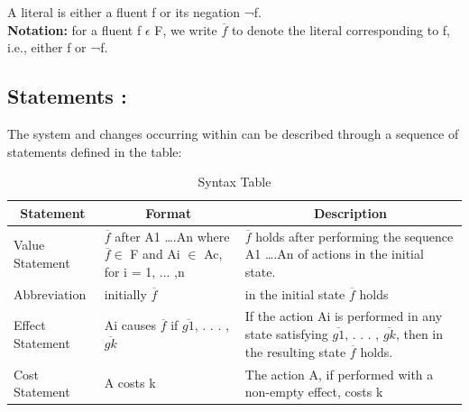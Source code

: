 \documentclass[11pt]{article}
\begin{document}
A literal is either a fluent f or its negation ¬f.\\
\textbf{Notation:} for a fluent f $\epsilon$ F, we write $\overline{f}$ to denote the literal corresponding to f, i.e., either f or ¬f.
\subsection{Statements :}\label{sec:Statements} 
	The system and changes occurring within can be described through a sequence of statements defined in the table:
	\begin{table}[H]
  \centering
    \begin{tabular}{|p{2cm}|p{4cm}|p{9cm}|}
    \hline
    \multicolumn{1}{|c|}{\textbf{Statement}} & \multicolumn{1}{c|}{\textbf{Format}} & \multicolumn{1}{c|}{\textbf{Description}} \\
    \hline
    Value Statement & $\overline{f}$ after A1 ….An where $\overline{f} \in$ F and Ai $\in$ Ac, for i = 1, ... ,n & $\overline{f}$ holds after performing the sequence A1 ….An of actions in the initial state. \\
    \hline
    Abbreviation & initially $\overline{f}$ & in the initial state $\overline{f}$ holds\\
    \hline
    Effect Statement & Ai causes $\overline{f}$ if $\overline{g1}$, . . . , $\overline{gk}$ & If the action Ai is performed in any state satisfying $\overline{g1}$, . . . , $\overline{gk}$, then in
    the resulting state $\overline{f}$ holds. \\
    \hline
    Cost Statement & A costs k & The action A, if performed with a non-empty effect, costs k \\
    \hline
    \end{tabular}
    \caption{Syntax Table}
  \label{tab:table01}
\end{table}
\end{document}
